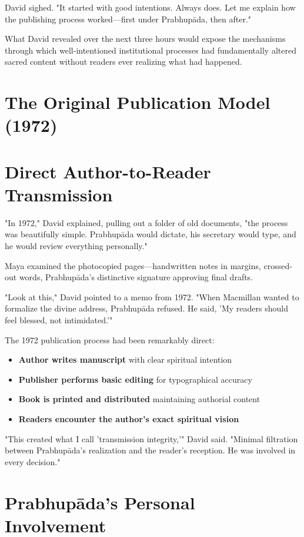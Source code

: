\documentclass[11pt,twoside]{book}
\begin{document}
David sighed. "It started with good intentions. Always does. Let me explain how the publishing process worked—first under Prabhupāda, then after."

What David revealed over the next three hours would expose the mechanisms through which well-intentioned institutional processes had fundamentally altered sacred content without readers ever realizing what had happened.
\section*{The Original Publication Model (1972)}
\label{sec:org83a572a}

\section*{Direct Author-to-Reader Transmission}
\label{sec:org7ef81d9}

"In 1972," David explained, pulling out a folder of old documents, "the process was beautifully simple. Prabhupāda would dictate, his secretary would type, and he would review everything personally."

Maya examined the photocopied pages—handwritten notes in margins, crossed-out words, Prabhupāda's distinctive signature approving final drafts.

"Look at this," David pointed to a memo from 1972. "When Macmillan wanted to formalize the divine address, Prabhupāda refused. He said, 'My readers should feel blessed, not intimidated.'"

The 1972 publication process had been remarkably direct:
\begin{itemize}
\item \textbf{\textbf{Author writes manuscript}} with clear spiritual intention
\item \textbf{\textbf{Publisher performs basic editing}} for typographical accuracy
\item \textbf{\textbf{Book is printed and distributed}} maintaining authorial content
\item \textbf{\textbf{Readers encounter the author's exact spiritual vision}}
\end{itemize}

"This created what I call 'transmission integrity,'" David said. "Minimal filtration between Prabhupāda's realization and the reader's reception. He was involved in every decision."
\section*{Prabhupāda's Personal Involvement}
\label{sec:orgb87c5af}
\end{document}
